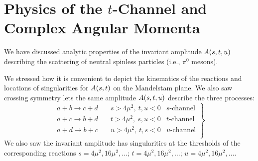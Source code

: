\chapter{Physics of the \texorpdfstring{$t$}{t}-Channel and Complex Angular Momenta}

\M We have discussed analytic properties of the invariant amplitude
$A(s,t,u)$ describing the scattering of neutral spinless
particles (i.e., $\pi^{0}$ mesons).

We stressed how it is convenient to depict the kinematics of the
reactions and locations of singularities for $A(s,t)$ on the
Mandelstam plane. We also saw crossing symmetry lets the same amplitude
$A(s,t,u)$ describe the three processes:
\begin{equation}
\left.\begin{array}{ccc}
a + b\to c+d          \quad& s>4\mu^{2},~ t,u<0 & \mbox{$s$-channel}\\
a+\bar{c}\to\bar{b}+d & t>4\mu^{2},~ s,u<0 & \mbox{$t$-channel}\\
a+\bar{d}\to\bar{b}+c & u>4\mu^{2},~ t,s<0 & \mbox{$u$-channel}\\
\end{array}\right\}
\end{equation}
We also saw the invariant amplitude has singularities at the thresholds
of the corresponding reactions $s=4\mu^{2},16\mu^{2},\dots$;
 $t=4\mu^{2},16\mu^{2},\dots$;  $u=4\mu^{2},16\mu^{2},\dots$.

